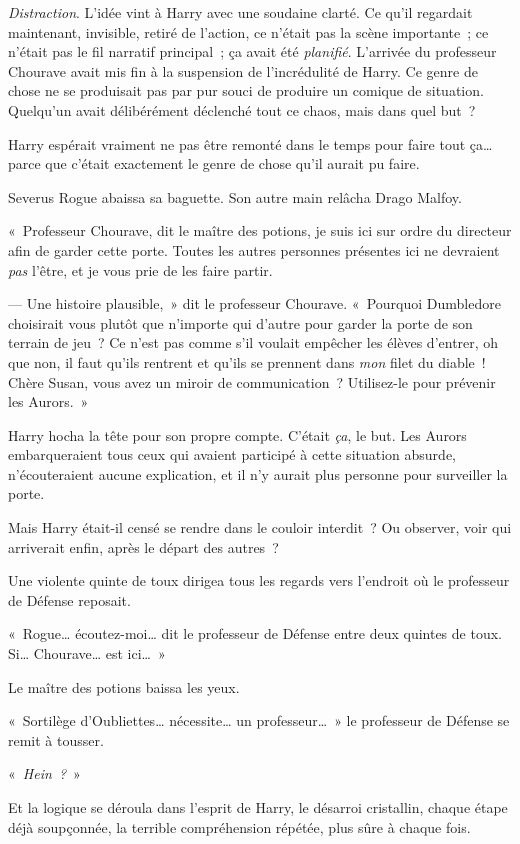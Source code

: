 \emph{Distraction}. L'idée vint à Harry avec une soudaine clarté. Ce qu'il regardait maintenant, invisible, retiré de l'action, ce n'était pas la scène importante~; ce n'était pas le fil narratif principal~; ça avait été \emph{planifié}. L'arrivée du professeur Chourave avait mis fin à la suspension de l'incrédulité de Harry. Ce genre de chose ne se produisait pas par pur souci de produire un comique de situation. Quelqu'un avait délibérément déclenché tout ce chaos, mais dans quel but~?

Harry espérait vraiment ne pas être remonté dans le temps pour faire tout ça… parce que c'était exactement le genre de chose qu'il aurait pu faire.

Severus Rogue abaissa sa baguette. Son autre main relâcha Drago Malfoy.

«~Professeur Chourave, dit le maître des potions, je suis ici sur ordre du directeur afin de garder cette porte. Toutes les autres personnes présentes ici ne devraient \emph{pas} l'être, et je vous prie de les faire partir.

--- Une histoire plausible,~» dit le professeur Chourave. «~Pourquoi Dumbledore choisirait vous plutôt que n'importe qui d'autre pour garder la porte de son terrain de jeu~? Ce n'est pas comme s'il voulait empêcher les élèves d'entrer, oh que non, il faut qu'ils rentrent et qu'ils se prennent dans \emph{mon} filet du diable~! Chère Susan, vous avez un miroir de communication~? Utilisez-le pour prévenir les Aurors.~»

Harry hocha la tête pour son propre compte. C'était \emph{ça}, le but. Les Aurors embarqueraient tous ceux qui avaient participé à cette situation absurde, n'écouteraient aucune explication, et il n'y aurait plus personne pour surveiller la porte.

Mais Harry était-il censé se rendre dans le couloir interdit~? Ou observer, voir qui arriverait enfin, après le départ des autres~?

Une violente quinte de toux dirigea tous les regards vers l'endroit où le professeur de Défense reposait.

«~Rogue… écoutez-moi… dit le professeur de Défense entre deux quintes de toux. Si… Chourave… est ici…~»

Le maître des potions baissa les yeux.

«~Sortilège d'Oubliettes… nécessite… un professeur…~» le professeur de Défense se remit à tousser.

«~\emph{Hein~?}~»

Et la logique se déroula dans l'esprit de Harry, le désarroi cristallin, chaque étape déjà soupçonnée, la terrible compréhension répétée, plus sûre à chaque fois.


